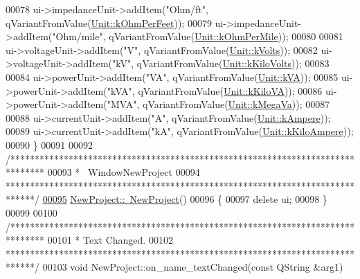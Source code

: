 \begin{DoxyCode}
00078   ui->impedanceUnit->addItem(\textcolor{stringliteral}{"Ohm/ft"}, qVariantFromValue(\hyperlink{class_unit_a3747e779c805df24a71961290be3fbdfa433b57934ca3be960ec7a60f3ea6ea87}{Unit::kOhmPerFeet}));
00079   ui->impedanceUnit->addItem(\textcolor{stringliteral}{"Ohm/mile"}, qVariantFromValue(\hyperlink{class_unit_a3747e779c805df24a71961290be3fbdfa1d5bb04c9ecda66b09891af21cd4f613}{Unit::kOhmPerMile}));
00080 
00081   ui->voltageUnit->addItem(\textcolor{stringliteral}{"V"}, qVariantFromValue(\hyperlink{class_unit_a55b07dfa9457e1eca2c7194fe0cfc3c1aa54b2473993a702a3923525765bd6e4c}{Unit::kVolts}));
00082   ui->voltageUnit->addItem(\textcolor{stringliteral}{"kV"}, qVariantFromValue(\hyperlink{class_unit_a55b07dfa9457e1eca2c7194fe0cfc3c1a35a201a658c2cd89766787c657e9a54d}{Unit::kKiloVolts}));
00083 
00084   ui->powerUnit->addItem(\textcolor{stringliteral}{"VA"}, qVariantFromValue(\hyperlink{class_unit_ace265ae255370ccacfd5370337572c3ba72b181a842ae2759488a2fa1410d3696}{Unit::kVA}));
00085   ui->powerUnit->addItem(\textcolor{stringliteral}{"kVA"}, qVariantFromValue(\hyperlink{class_unit_ace265ae255370ccacfd5370337572c3bac9e5154522fbb810d7aed75c3ff47cb2}{Unit::kKiloVA}));
00086   ui->powerUnit->addItem(\textcolor{stringliteral}{"MVA"}, qVariantFromValue(\hyperlink{class_unit_ace265ae255370ccacfd5370337572c3ba6039da0ed20f8bee64305bab8bdec365}{Unit::kMegaVa}));
00087 
00088   ui->currentUnit->addItem(\textcolor{stringliteral}{"A"}, qVariantFromValue(\hyperlink{class_unit_a0794cf6c9682f48296dd4a5315389787a368a3c470f0b590a6100dda717a7dd4f}{Unit::kAmpere}));
00089   ui->currentUnit->addItem(\textcolor{stringliteral}{"kA"}, qVariantFromValue(\hyperlink{class_unit_a0794cf6c9682f48296dd4a5315389787aa27cb5edd73099f24f2285e02396ae14}{Unit::kKiloAmpere}));
00090 \}
00091 
00092 \textcolor{comment}{/*******************************************************************************}
00093 \textcolor{comment}{ * ~WindowNewProject}
00094 \textcolor{comment}{ ******************************************************************************/}
\hypertarget{newproject_8cpp_source_l00095}{}\hyperlink{group___window_gae65155941598f4272f3df0b2f1428c78}{00095} \hyperlink{group___window_gae65155941598f4272f3df0b2f1428c78}{NewProject::~NewProject}()
00096 \{
00097   \textcolor{keyword}{delete} ui;
00098 \}
00099 
00100 \textcolor{comment}{/*******************************************************************************}
00101 \textcolor{comment}{ * Text Changed.}
00102 \textcolor{comment}{ ******************************************************************************/}
00103 \textcolor{keywordtype}{void} NewProject::on\_name\_textChanged(\textcolor{keyword}{const} QString &arg1)

\end{DoxyCode}
